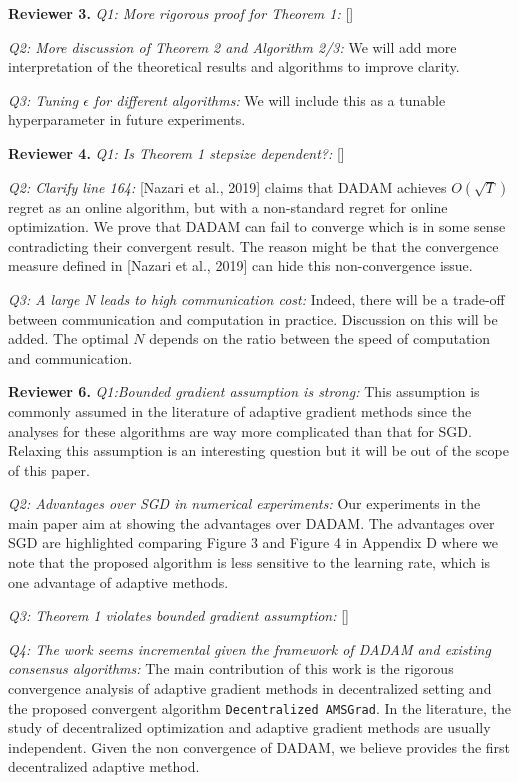 \documentclass{article}
\begin{document}
\textbf{Reviewer 3.}
\textit{Q1: More rigorous proof for Theorem 1:}
[]

\textit{Q2: More discussion of Theorem 2 and Algorithm 2/3:}
We will add more interpretation of the theoretical results and algorithms to improve clarity. 

\textit{Q3: Tuning $\epsilon$ for different algorithms:}
We will include this as a tunable hyperparameter in future experiments. 

\textbf{Reviewer 4.}
\textit{Q1: Is Theorem 1 stepsize dependent?:}
[]

\textit{Q2:  Clarify line 164:}
 [Nazari et al., 2019] claims that DADAM achieves $O(\sqrt{T})$ regret as an online algorithm, but with a non-standard regret for online optimization. 
 We prove that DADAM can fail to converge which is in some sense contradicting their convergent result. The reason might be that the convergence measure defined in [Nazari et al., 2019] can hide this non-convergence issue.

\textit{Q3: A large N leads to high communication cost:}
Indeed, there will be a trade-off between communication and computation in practice.
Discussion on this will be added.
The optimal $N$ depends on the ratio between the speed of computation and communication.   

\textbf{Reviewer 6.}
\textit{Q1:Bounded gradient assumption is strong:}
This assumption is commonly assumed in the literature of adaptive gradient methods since the analyses for these algorithms are way more complicated than that for SGD. 
Relaxing this assumption is an interesting question but it will be out of the scope of this paper.

\textit{Q2: Advantages over SGD in numerical experiments:}
Our experiments in the main paper aim at showing the advantages over DADAM. 
The advantages over SGD are highlighted comparing Figure 3 and Figure 4 in Appendix D where we note that the proposed algorithm is less sensitive to the learning rate, which is one advantage of adaptive methods.

\textit{Q3: Theorem 1 violates bounded gradient assumption:}
[]

\textit{Q4: The work seems incremental given the framework of DADAM and existing consensus algorithms:}
The main contribution of this work is the rigorous convergence analysis of adaptive gradient methods in decentralized setting and the proposed convergent algorithm \texttt{Decentralized AMSGrad}. 
In the literature, the study of decentralized optimization and adaptive gradient methods are usually independent. 
Given the non convergence of DADAM, we believe provides the first decentralized adaptive method.
\end{document}
